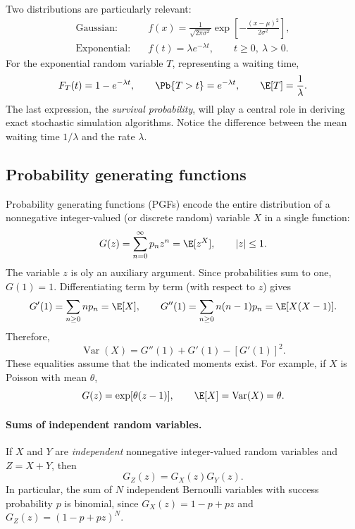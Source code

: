 Two distributions are particularly relevant:
\begin{align}
 \text{Gaussian:}\quad &f(x)=\frac{1}{\sqrt{2\pi\sigma^2}}
 \exp\!\left[-\frac{(x-\mu)^2}{2\sigma^2}\right],\\
 \text{Exponential:}\quad &f(t)=\lambda e^{-\lambda t},\qquad t\geq0,\ \lambda>0.
 \label{eq:basic_exponential_pdf}
\end{align}
For the exponential random variable $T$, representing a waiting time,
\begin{equation}
 F_T(t)=1-e^{-\lambda t},\qquad
 \Pb\{T>t\}=e^{-\lambda t},\qquad
 \E[T]=\frac{1}{\lambda}.
 \label{eq:basic_exp_waiting}
\end{equation}
The last expression, the \emph{survival probability}, will play a central role in deriving exact stochastic simulation algorithms. Notice the difference between the mean waiting time $1/\lambda$ and the rate $\lambda$.

\subsection{Probability generating functions}
\label{sec:basic_pgf}
Probability generating functions (PGFs) encode the entire distribution of a nonnegative integer-valued (or discrete random) variable $X$ in a single function:
\begin{equation}
 G(z)=\sum_{n=0}^{\infty}p_nz^n =\E[z^X], \qquad |z|\leq1.
 \label{GenFunc_Def}
\end{equation}
The variable $z$ is oly an auxiliary argument. Since probabilities sum to one, $G(1)=1$. Differentiating term by term (with respect to $z$) gives
\begin{equation}
 G'(1)=\sum_{n\geq0}np_n=\E[X],\qquad
 G''(1)=\sum_{n\geq0}n(n-1)p_n=\E[X(X-1)].
\end{equation}
Therefore,
\begin{equation}
 \boxed{\operatorname{Var}(X)=G''(1)+G'(1)-[G'(1)]^2.}
 \label{eq:basic_pgf_variance}
\end{equation}
These equalities assume that the indicated moments exist. For example, if $X$ is Poisson with mean $\theta$,
\begin{equation}
 G(z)=\exp[\theta(z-1)],\qquad
 \E[X]=\operatorname{Var}(X)=\theta.
\end{equation}

\paragraph{Sums of independent random variables.}
If $X$ and $Y$ are \emph{independent} nonnegative integer-valued random variables and $Z=X+Y$, then
\begin{equation}
 G_Z(z)=G_X(z)G_Y(z).
 \label{eq:basic_pgf_product}
\end{equation}
In particular, the sum of $N$ independent Bernoulli variables with success probability $p$ is binomial, since $G_X(z)=1-p+pz$ and $G_Z(z)=(1-p+pz)^N$.

